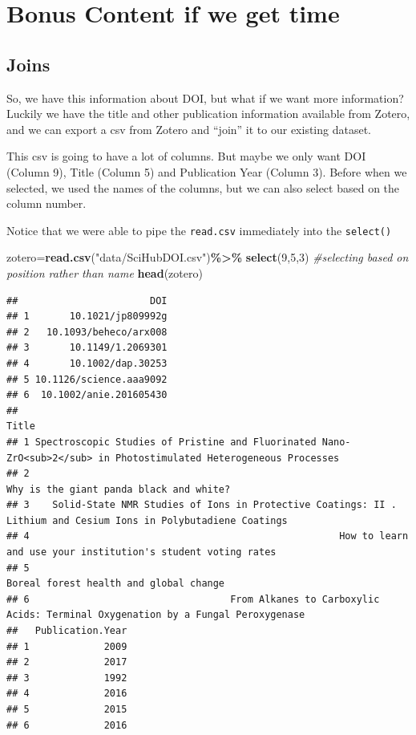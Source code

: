 \documentclass[
]{article}
\newenvironment{Shaded}{\begin{snugshade}}{\end{snugshade}}
\newcommand{\CommentTok}[1]{\textcolor[rgb]{0.56,0.35,0.01}{\textit{#1}}}
\newcommand{\DecValTok}[1]{\textcolor[rgb]{0.00,0.00,0.81}{#1}}
\newcommand{\FunctionTok}[1]{\textcolor[rgb]{0.13,0.29,0.53}{\textbf{#1}}}
\newcommand{\NormalTok}[1]{#1}
\newcommand{\OtherTok}[1]{\textcolor[rgb]{0.56,0.35,0.01}{#1}}
\newcommand{\SpecialCharTok}[1]{\textcolor[rgb]{0.81,0.36,0.00}{\textbf{#1}}}
\newcommand{\StringTok}[1]{\textcolor[rgb]{0.31,0.60,0.02}{#1}}
\begin{document}
\section{Bonus Content if we get
time}\label{bonus-content-if-we-get-time}

\subsection{Joins}\label{joins}

So, we have this information about DOI, but what if we want more
information? Luckily we have the title and other publication information
available from Zotero, and we can export a csv from Zotero and ``join''
it to our existing dataset.

This csv is going to have a lot of columns. But maybe we only want DOI
(Column 9), Title (Column 5) and Publication Year (Column 3). Before
when we selected, we used the names of the columns, but we can also
select based on the column number.

Notice that we were able to pipe the \texttt{read.csv} immediately into
the \texttt{select()}

\begin{Shaded}
\begin{Highlighting}[]
\NormalTok{zotero}\OtherTok{=}\FunctionTok{read.csv}\NormalTok{(}\StringTok{"data/SciHubDOI.csv"}\NormalTok{)}\SpecialCharTok{\%\textgreater{}\%}
  \FunctionTok{select}\NormalTok{(}\DecValTok{9}\NormalTok{,}\DecValTok{5}\NormalTok{,}\DecValTok{3}\NormalTok{) }\CommentTok{\#selecting based on position rather than name }
\FunctionTok{head}\NormalTok{(zotero)}
\end{Highlighting}
\end{Shaded}

\begin{verbatim}
##                       DOI
## 1       10.1021/jp809992g
## 2   10.1093/beheco/arx008
## 3       10.1149/1.2069301
## 4       10.1002/dap.30253
## 5 10.1126/science.aaa9092
## 6  10.1002/anie.201605430
##                                                                                                               Title
## 1 Spectroscopic Studies of Pristine and Fluorinated Nano-ZrO<sub>2</sub> in Photostimulated Heterogeneous Processes
## 2                                                                           Why is the giant panda black and white?
## 3    Solid‐State NMR Studies of Ions in Protective Coatings: II . Lithium and Cesium Ions in Polybutadiene Coatings
## 4                                                      How to learn and use your institution's student voting rates
## 5                                                                            Boreal forest health and global change
## 6                                   From Alkanes to Carboxylic Acids: Terminal Oxygenation by a Fungal Peroxygenase
##   Publication.Year
## 1             2009
## 2             2017
## 3             1992
## 4             2016
## 5             2015
## 6             2016
\end{verbatim}
\end{document}
